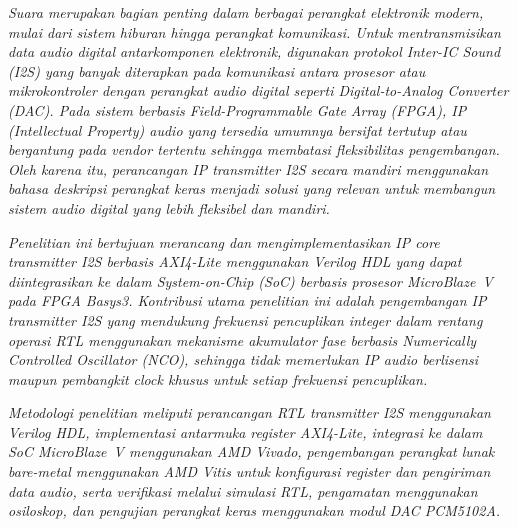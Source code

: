 \hspace{1cm}\textit{Suara merupakan bagian penting dalam berbagai perangkat elektronik modern, mulai dari sistem hiburan hingga perangkat komunikasi. Untuk mentransmisikan data audio digital antarkomponen elektronik, digunakan protokol Inter-IC Sound (I2S) yang banyak diterapkan pada komunikasi antara prosesor atau mikrokontroler dengan perangkat audio digital seperti Digital-to-Analog Converter (DAC). Pada sistem berbasis Field-Programmable Gate Array (FPGA), IP (\textit{Intellectual Property}) audio yang tersedia umumnya bersifat tertutup atau bergantung pada vendor tertentu sehingga membatasi fleksibilitas pengembangan. Oleh karena itu, perancangan IP transmitter I2S secara mandiri menggunakan bahasa deskripsi perangkat keras menjadi solusi yang relevan untuk membangun sistem audio digital yang lebih fleksibel dan mandiri.}

\par\vspace{0.8em}

\hspace{1cm}\textit{Penelitian ini bertujuan merancang dan mengimplementasikan IP core transmitter I2S berbasis AXI4-Lite menggunakan Verilog HDL yang dapat diintegrasikan ke dalam System-on-Chip (SoC) berbasis prosesor MicroBlaze~V pada FPGA Basys3. Kontribusi utama penelitian ini adalah pengembangan IP transmitter I2S yang mendukung frekuensi pencuplikan integer dalam rentang operasi RTL menggunakan mekanisme akumulator fase berbasis Numerically Controlled Oscillator (NCO), sehingga tidak memerlukan IP audio berlisensi maupun pembangkit clock khusus untuk setiap frekuensi pencuplikan.}

\par\vspace{0.8em}

\hspace{1cm}\textit{Metodologi penelitian meliputi perancangan RTL transmitter I2S menggunakan Verilog HDL, implementasi antarmuka register AXI4-Lite, integrasi ke dalam SoC MicroBlaze~V menggunakan AMD Vivado, pengembangan perangkat lunak bare-metal menggunakan AMD Vitis untuk konfigurasi register dan pengiriman data audio, serta verifikasi melalui simulasi RTL, pengamatan menggunakan osiloskop, dan pengujian perangkat keras menggunakan modul DAC PCM5102A.}

\par\vspace{0.8em}

